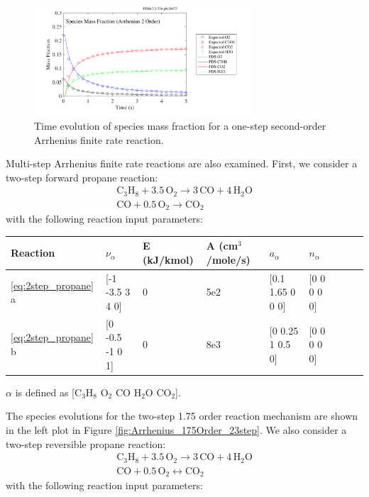\documentclass[11pt]{book}
\begin{document}
\begin{figure}[ht]
\begin{center}
\includegraphics[width=3.2in]{SCRIPT_FIGURES/ReactionRate_Arrhenius_2Order_1Step}
\end{center}
\caption[Species Evolution in Finite Rate Reaction]{Time evolution of species mass fraction for a one-step second-order Arrhenius finite rate reaction.}
\label{fig:Arrhenius_2Order_1step}
\end{figure}
Multi-step Arrhenius finite rate reactions are also examined. First, we consider a two-step forward propane reaction:
\begin{eqnarray}\label{eq:2step_propane}
\mathrm{C_3H_8+3.5 \, O_2 \rightarrow  3 \, CO + 4 \, H_2O} \\
\nonumber \mathrm{CO+0.5 \, O_2 \rightarrow CO_2}
\end{eqnarray}
with the following reaction input parameters:

\begin{center}
\begin{tabular}{|l|l|l|l|l|l|l|l|l|}
\hline Reaction & $\nu_{\alpha}$ & E (kJ/kmol) & A (cm$^3$/mole/s) & $a_{\alpha}$ & $n_{\alpha}$  \\ \hline \hline
\ref{eq:2step_propane} a & [-1 -3.5 3 4 0] & 0 & 5e2 & [0.1 1.65 0 0 0] & [0 0 0 0 0] \\ \hline
\ref{eq:2step_propane} b & [0 -0.5 -1 0 1] & 0 & 8e3 & [0 0.25 1 0.5 0] & [0 0 0 0 0] \\ \hline
\end{tabular}
\vskip8pt
$\alpha$ is defined as [$\mathrm{C_3H_8}$ $\mathrm{O_2}$ $\mathrm{CO}$ $\mathrm{H_2O}$ $\mathrm{CO_2}$].
\end{center}
The species evolutions for the two-step 1.75 order reaction mechanism are shown in the left plot in Figure \ref{fig:Arrhenius_175Order_23step}. We also consider a two-step reversible propane reaction:
\begin{eqnarray}\label{eq:2step_propane_rev}
\mathrm{C_3H_8+3.5 \, O_2 \rightarrow  3 \, CO+4 \, H_2O} \\
\nonumber \mathrm{CO + 0.5 \, O_2 \leftrightarrow CO_2}
\end{eqnarray}
with the following reaction input parameters:
\end{document}
